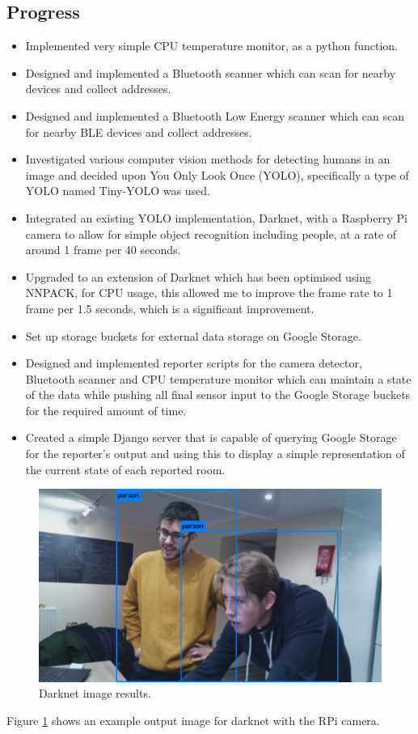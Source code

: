 \documentclass[11pt]{article}
\begin{document}
\subsection{Progress}\label{progress}
\begin{itemize}
  \item Implemented very simple CPU temperature monitor, as a python function.
  \item Designed and implemented a Bluetooth scanner which can scan for nearby devices and collect addresses.
  \item Designed and implemented a Bluetooth Low Energy scanner which can scan for nearby BLE devices and collect addresses.
  \item Investigated various computer vision methods for detecting humans in an image and decided upon You Only Look Once (YOLO), specifically a type of YOLO named Tiny-YOLO was used.
  \item Integrated an existing YOLO implementation, Darknet, with a Raspberry Pi camera to allow for simple object recognition including people, at a rate of around 1 frame per 40 seconds.
  \item Upgraded to an extension of Darknet which has been optimised using NNPACK, for CPU usage, this allowed me to improve the frame rate to 1 frame per 1.5 seconds, which is a significant improvement.
  \item Set up storage buckets for external data storage on Google Storage.
  \item Designed and implemented reporter scripts for the camera detector, Bluetooth scanner and CPU temperature monitor which can maintain a state of the data while pushing all final sensor input to the Google Storage buckets for the required amount of time.
  \item Created a simple Django server that is capable of querying Google Storage for the reporter's output and using this to display a simple representation of the current state of each reported room.
\end{itemize}
\begin{figure}
  \includegraphics[scale=0.1]{yolo_example.jpg}
  \caption{Darknet image results.}
  \label{fig:result}
\end{figure}
Figure \ref{fig:result} shows an example output image for darknet with the RPi camera.
\end{document}
